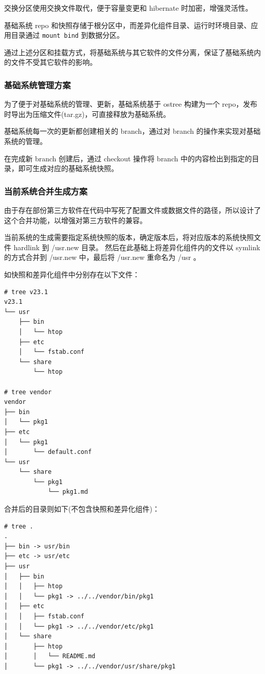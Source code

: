 \documentclass{utart}
\begin{document}
交换分区使用交换文件取代，便于容量变更和 hibernate 时加密，增强灵活性。

基础系统 repo 和快照存储于根分区中，而差异化组件目录、运行时环境目录、应用目录通过 \texttt{mount bind} 到数据分区。

通过上述分区和挂载方式，将基础系统与其它软件的文件分离，保证了基础系统内的文件不受其它软件的影响。

\subsubsection{基础系统管理方案}
为了便于对基础系统的管理、更新，基础系统基于 ostree 构建为一个 repo，发布时导出为压缩文件(tar.gz)，可直接释放为基础系统。

基础系统每一次的更新都创建相关的 branch，通过对 branch 的操作来实现对基础系统的管理。

在完成新 branch 创建后，通过 checkout 操作将 branch 中的内容检出到指定的目录，即可生成对应的基础系统快照。

\subsubsection{当前系统合并生成方案}
由于存在部份第三方软件在代码中写死了配置文件或数据文件的路径，所以设计了这个合并功能，以增强对第三方软件的兼容。

当前系统的生成需要指定系统快照的版本，确定版本后，将对应版本的系统快照文件 hardlink 到 /usr.new 目录。
然后在此基础上将差异化组件内的文件以 symlink 的方式合并到 /usr.new 中，最后将 /usr.new 重命名为 /usr 。

如快照和差异化组件中分别存在以下文件：
\begin{verbatim}
# tree v23.1
v23.1
└── usr
    ├── bin
    │   └── htop
    ├── etc
    │   └── fstab.conf
    └── share
        └── htop

# tree vendor
vendor
├── bin
│   └── pkg1
├── etc
│   └── pkg1
│       └── default.conf
└── usr
    └── share
        └── pkg1
            └── pkg1.md
\end{verbatim}

合并后的目录则如下(不包含快照和差异化组件)：
\begin{verbatim}
# tree .
.
├── bin -> usr/bin
├── etc -> usr/etc
├── usr
│   ├── bin
│   │   ├── htop
│   │   └── pkg1 -> ../../vendor/bin/pkg1
│   ├── etc
│   │   ├── fstab.conf
│   │   └── pkg1 -> ../../vendor/etc/pkg1
│   └── share
│       ├── htop
│       │   └── README.md
│       └── pkg1 -> ../../vendor/usr/share/pkg1
\end{verbatim}
\end{document}
